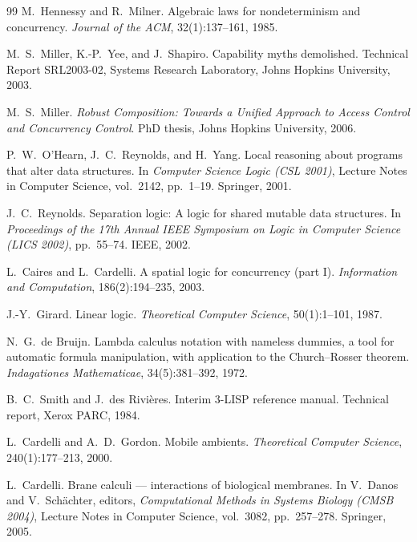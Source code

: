 \documentclass[11pt]{article}
\theoremstyle{definition}
\theoremstyle{plain}
\begin{document}
\begin{thebibliography}{99}
M.~Hennessy and R.~Milner.
\newblock Algebraic laws for nondeterminism and concurrency.
\newblock \emph{Journal of the ACM}, 32(1):137--161, 1985.

M.~S.~Miller, K.-P.~Yee, and J.~Shapiro.
\newblock Capability myths demolished.
\newblock Technical Report SRL2003-02, Systems Research Laboratory,
  Johns Hopkins University, 2003.

M.~S.~Miller.
\newblock \emph{Robust Composition: Towards a Unified Approach to Access
  Control and Concurrency Control}.
\newblock PhD thesis, Johns Hopkins University, 2006.

P.~W.~O'Hearn, J.~C.~Reynolds, and H.~Yang.
\newblock Local reasoning about programs that alter data structures.
\newblock In \emph{Computer Science Logic (CSL 2001)}, Lecture Notes in
  Computer Science, vol.~2142, pp.~1--19. Springer, 2001.

J.~C.~Reynolds.
\newblock Separation logic: A logic for shared mutable data structures.
\newblock In \emph{Proceedings of the 17th Annual IEEE Symposium on Logic
  in Computer Science (LICS 2002)}, pp.~55--74. IEEE, 2002.

L.~Caires and L.~Cardelli.
\newblock A spatial logic for concurrency (part I).
\newblock \emph{Information and Computation}, 186(2):194--235, 2003.

J.-Y.~Girard.
\newblock Linear logic.
\newblock \emph{Theoretical Computer Science}, 50(1):1--101, 1987.

N.~G.~de Bruijn.
\newblock Lambda calculus notation with nameless dummies, a tool for
  automatic formula manipulation, with application to the Church--Rosser
  theorem.
\newblock \emph{Indagationes Mathematicae}, 34(5):381--392, 1972.

B.~C.~Smith and J.~des Rivi\`eres.
\newblock Interim 3-LISP reference manual.
\newblock Technical report, Xerox PARC, 1984.

L.~Cardelli and A.~D.~Gordon.
\newblock Mobile ambients.
\newblock \emph{Theoretical Computer Science}, 240(1):177--213, 2000.

L.~Cardelli.
\newblock Brane calculi --- interactions of biological membranes.
\newblock In V.~Danos and V.~Sch\"achter, editors, \emph{Computational
  Methods in Systems Biology (CMSB 2004)}, Lecture Notes in Computer
  Science, vol.~3082, pp.~257--278. Springer, 2005.


\end{thebibliography}
\end{document}
